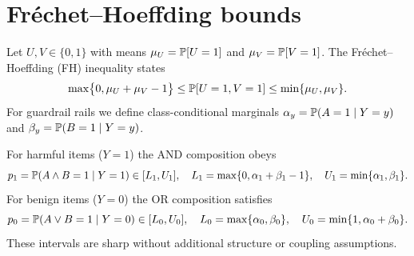 \section{Fr\'echet--Hoeffding bounds}
Let $U,V\in\{0,1\}$ with means $\mu_U=\mathbb{P}[U=1]$ and $\mu_V=\mathbb{P}[V=1]$. The Fr\'echet--Hoeffding
(FH) inequality states
\[
\max\bigl\{0,\mu_U+\mu_V-1\bigr\} \le \mathbb{P}[U=1,V=1] \le \min\{\mu_U,\mu_V\}.
\]
For guardrail rails we define class-conditional marginals
$\alpha_y=\mathbb{P}(A=1\mid Y=y)$ and $\beta_y=\mathbb{P}(B=1\mid Y=y)$.

For harmful items ($Y=1$) the AND composition obeys
\[
p_1=\mathbb{P}(A\wedge B=1\mid Y=1)\in [L_1,U_1], \quad
L_1=\max\{0,\alpha_1+\beta_1-1\}, \quad U_1=\min\{\alpha_1,\beta_1\}.
\]
For benign items ($Y=0$) the OR composition satisfies
\[
p_0=\mathbb{P}(A\vee B=1\mid Y=0)\in [L_0,U_0], \quad
L_0=\max\{\alpha_0,\beta_0\}, \quad U_0=\min\{1,\alpha_0+\beta_0\}.
\]
These intervals are sharp without additional structure or coupling assumptions.
